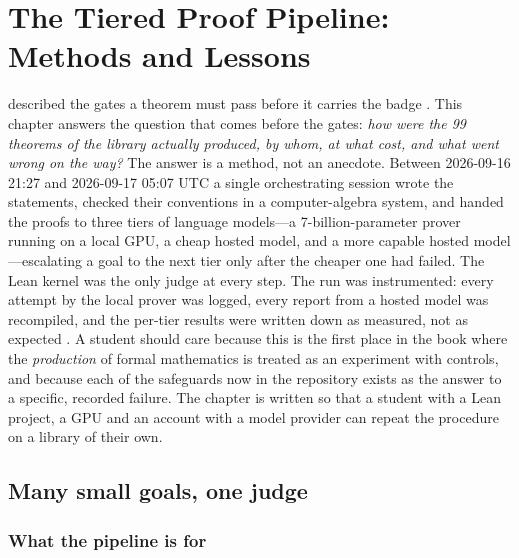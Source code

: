 \chapter{The Tiered Proof Pipeline: Methods and Lessons}\label{ch:pipeline}

 described the gates a theorem must pass before it carries the badge
\TA. This chapter answers the question that comes before the gates: \emph{how were the 99
theorems of the library  actually produced, by whom, at what cost,
and what went wrong on the way?} The answer is a method, not an anecdote. Between
2026-09-16 21:27 and 2026-09-17 05:07 UTC a single orchestrating session wrote the
statements, checked their conventions in a computer-algebra system, and handed the proofs
to three tiers of language models---a 7-billion-parameter prover running on a local GPU, a
cheap hosted model, and a more capable hosted model---escalating a goal to the next tier
only after the cheaper one had failed. The Lean kernel was the only judge at every step.
The run was instrumented: every attempt by the local prover was logged, every report from a
hosted model was recompiled, and the per-tier results were written down as measured, not as
expected . A student should care because this
is the first place in the book where the \emph{production} of formal mathematics is treated
as an experiment with controls, and because each of the safeguards now in the repository
exists as the answer to a specific, recorded failure. The chapter is written so that a
student with a Lean project, a GPU and an account with a model provider can repeat the
procedure on a library of their own.

\section{Many small goals, one judge}\label{sec:pipeline:judge}

\subsection{What the pipeline is for}

